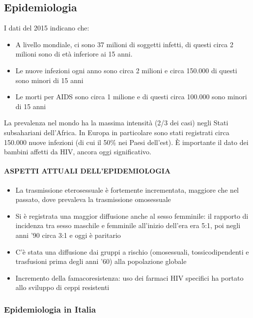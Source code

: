 \subsection{Epidemiologia}

I dati del 2015 indicano che:

\begin{itemize}
\item
  A livello mondiale, ci sono 37 milioni di soggetti infetti, di questi
  circa 2 milioni sono di età inferiore ai 15 anni.
\item
  Le nuove infezioni ogni anno sono circa 2 milioni e circa 150.000 di
  questi sono minori di 15 anni
\item
  Le morti per AIDS sono circa 1 milione e di questi circa 100.000 sono
  minori di 15 anni
\end{itemize}

La prevalenza nel mondo ha la massima intensità (2/3 dei casi) negli
Stati subsahariani dell'Africa. In Europa in particolare sono stati
registrati circa 150.000 nuove infezioni (di cui il 50\% nei Paesi
dell'est). È importante il dato dei bambini affetti da HIV, ancora oggi
significativo.

\paragraph{ASPETTI ATTUALI DELL'EPIDEMIOLOGIA}

\begin{itemize}
\item
  La trasmissione eterosessuale è fortemente incrementata, maggiore che
  nel passato, dove prevaleva la trasmissione omosessuale
\item
  Si è registrata una maggior diffusione anche al sesso femminile: il
  rapporto di incidenza tra sesso maschile e femminile all'inizio
  dell'era era 5:1, poi negli anni '90 circa 3:1 e oggi è paritario
\item
  C'è stata una diffusione dai gruppi a rischio (omosessuali,
  tossicodipendenti e trasfusioni prima degli anni '60) alla popolazione
  globale
\item
  Incremento della famacoresistenza: uso dei farmaci HIV specifici ha
  portato allo sviluppo di ceppi resistenti
\end{itemize}

\subsubsection{Epidemiologia in Italia}

